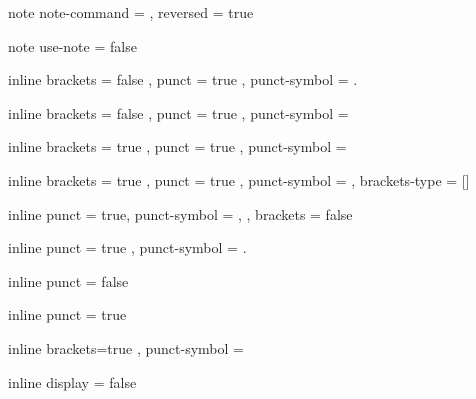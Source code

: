  {note}
  {
    note-command =  ,
    reversed     = true
  }

 {note}
  { use-note = false }

 {inline}
  {
    brackets     = false ,
    punct        = true ,
    punct-symbol = .
  }

 {inline}
  {
    brackets     = false ,
    punct        = true ,
    punct-symbol =
  }

 {inline}
  {
    brackets     = true ,
    punct        = true ,
    punct-symbol =
  }

 {inline}
  {
    brackets      = true ,
    punct         = true ,
    punct-symbol  = ,
    brackets-type = []
  }

 {inline}
  {
    punct         = true,
    punct-symbol  = {,} ,
    brackets      = false
  }

 {inline}
  {
    punct = true ,
    punct-symbol = .
  }
  
   {inline}
  { punct = false }

   {inline}
  { punct = true }

   {inline}
  {
    brackets=true ,
    punct-symbol = ~
  }

    {inline}
  { display = false }


